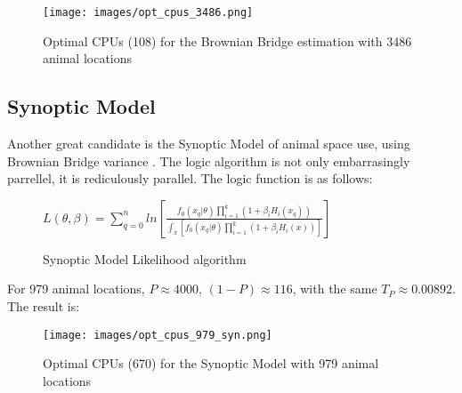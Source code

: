 \begin{figure}[h!]
        \begin{center}
                \texttt{[image: images/opt\_cpus\_3486.png]}
                \caption{Optimal CPUs (108) for the Brownian Bridge estimation with 3486 animal locations}
                \label{opt_cpus_3486}
        \end{center}
\end{figure}

\subsection{Synoptic Model}
Another great candidate is the Synoptic Model of animal space use, using Brownian Bridge variance \cite{syn}.
The logic algorithm is not only embarrasingly parrellel, it is rediculously parallel. The logic function is as
follows:

\begin{figure}[h!]
        \begin{center}
                $L(\theta, \beta) = \sum_{q=0}^{n} ln[\frac{ f_0(x_q|\theta) \prod_{i=1}^k (1 + \beta_i H_i(x_q)) }{  \int_x [f_0(x_q|\theta) \prod_{i=1}^k (1 + \beta_i H_i(x))] }]$
                \caption{Synoptic Model Likelihood algorithm \cite{syn}}
                \label{bb_est}
        \end{center}
\end{figure}

For 979 animal locations, $P \approx 4000$, $(1 - P) \approx 116$, with the same $T_P \approx 0.00892$.
The result is:

\begin{figure}[h!]
        \begin{center}
                \texttt{[image: images/opt\_cpus\_979\_syn.png]}
                \caption{Optimal CPUs (670) for the Synoptic Model \cite{syn} with 979 animal locations}
                \label{opt_cpus_syn_979}
        \end{center}
\end{figure}


